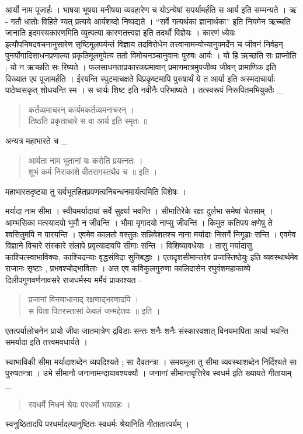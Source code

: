 आर्यो नाम पूजार्हः । भाषया भूषया मनीषया व्यवहारेण च योऽन्येषां सपर्यामर्हति स आर्य इति सम्मन्यते । ऋ - गतौ धातोः विहिते ण्यत् प्रत्यये आर्यशब्दो निष्पद्यते । “सर्वे गत्यर्थका ज्ञानार्थका” इति नियमेन ऋच्चति जानाति इदमस्यकारणमिति व्युत्पत्या कारणतत्त्वज्ञ इति तदर्थो विज्ञेयः । कारणं ध्येयः इत्यौपनिषदवचनानुसारेण सृष्टिमूलपर्यन्तं विज्ञाय तदविरोधेन तत्त्वानामन्योन्यानुपमर्देन च जीवनं निर्वहन् पुनर्योगादिसाधनप्रणाल्या प्रकृतिमूलमुपेत्य ततो विमोचनञ्चानुवानः पुरुषः आर्यः । यो हि ऋच्छति सः प्राप्नोति ; यो न ऋच्छति सः रिष्यते । फलसाधनताप्रकारकप्रमावान् प्रमाणमात्रमुपजीव्य जीवन् प्रामाणिक इति विख्यात एव पूजामर्हति । ईरयन्ति स्पुटमाचक्षते विप्रकृष्टमापि पुरुषार्थं ये त आर्या इति अस्मदाचार्याः पाठेष्वसकृत् शोधयन्ति स्म । स चार्यः शिष्ट इति नवीनैः परिभाष्यते । तत्स्वरूपं निरूपितमभियुक्तैः _
\begin{verse}
कर्तव्यमाचरन् कार्यमकर्तव्यमनाचरन् ।\\
तिष्ठति प्रकृताचारे स वा आर्य इति स्मृतः ॥
\end{verse}
अन्यत्र महाभारते च \_ 
\begin{verse}
आर्यता नाम भूतानां यः करोति प्रयत्नतः ।\\
शुभं कर्म निराकाशे वीतरागस्तथैव च ॥ इति ।
\end{verse}
महाभारतदृष्ट्या तु सर्वभूतहितप्रवणत्वनिबन्धनमार्यत्वमिति विशेषः ।

मर्यादा नाम सीमा । स्वीयमर्यादायां सर्वे सुर्क्ष्या भवन्ति । सीमातिरेके रक्षा दुर्लभा समेषां चेतसाम् । आम्भसिका मत्स्यादयो भूमौ न जीवन्ति । भौमा मृगादयो नाप्सु जीवन्ति । किमुत कतिपय क्षणेषु ते श्वसितुमपि न पारयन्ति । एवमेव कालतो वस्तुतः सन्निवेशतश्च नाना मर्यादाः निसर्गे निगूढाः सन्ति । एवमेव विज्ञाने विचारे संस्कारे संलापे प्रवृत्यादावपि सीमाः सन्ति । विशिष्यावधेयाः । तासु मर्यादासु काश्चित्स्वाभाविक्यः, काश्चिदन्याः वृद्धसंविदा सुनिबद्धाः । एतादृशसीमान्तरेव प्रजास्तिष्ठेयुः इति व्यवस्थार्थमेव राजानः सृष्टाः , प्रभवश्चोद्भाविताः । अत एव कविकुलगुरुणा कालिदासेन रघुवंशमहाकाव्ये दिलीपगुणवर्णनावसरे राजधर्मस्य मर्मैवं प्राकाश्यत -
\begin{verse}
प्रजानां विनयाधानाद् रक्षणाद्भरणादपि ।\\ 
स पिता पितरस्तासां केवलं जन्महेतवः ॥ इति ।
\end{verse}
एतत्पर्यालोचनेन प्रायो जीवा जातमात्रेण द्रविडाः सन्तः शनैः शनैः संस्कारवशात् विनयमापिता आर्या भवन्ति समर्यादा इति तत्त्वमवधार्यते ।

स्वाभाविकी सीमा मर्यादाशब्देन व्यपदिश्यते ; सा दैवतन्त्रा । समयमूला तु सीमा व्यवस्थाशब्देन निर्दिश्यते सा पुरुषतन्त्रा ।  उभे सीमानौ जनानामन्दायावश्यक्यौ । जनानां सीमान्तवृत्तिरेव स्वधर्म इति ख्यायते गीतायाम् \_ 
\begin{verse}
स्वधर्मे निधनं श्रेयः परधर्मो भयावहः । 
\end{verse}
स्वनुष्ठितादपि परधर्मादल्पानुष्ठितः स्वधर्मः श्रेयानिति गीतातात्पर्यम् ।

